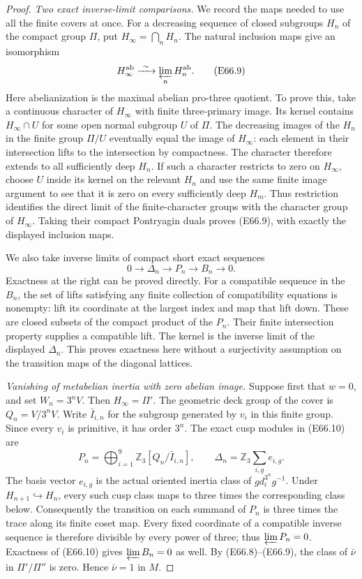 \begin{proof}
\emph{Two exact inverse-limit comparisons.}
We record the maps needed to use all the finite covers at once.
For a decreasing sequence of closed subgroups $H_n$ of the
compact group $\Pi$, put $H_\infty=\bigcap_nH_n$.
The natural inclusion maps give an isomorphism
\[
                 H_\infty^{\rm ab}
                       \xrightarrow{\ \sim\ }
                       \varprojlim_n H_n^{\rm ab}.
 \tag{E66.9}
\]
Here abelianization is the maximal abelian pro-three quotient.
To prove this, take a continuous character of $H_\infty$ with
finite three-primary image. Its kernel contains
$H_\infty\cap U$ for some open normal subgroup $U$ of $\Pi$.
The decreasing images of the $H_n$ in the finite group $\Pi/U$
eventually equal the image of $H_\infty$: each element in their
intersection lifts to the intersection by compactness.
The character therefore extends to all sufficiently deep $H_n$.
If such a character restricts to zero on $H_\infty$, choose $U$
inside its kernel on the relevant $H_n$ and use the same finite
image argument to see that it is zero on every sufficiently
deep $H_m$. Thus restriction identifies the direct limit of the
finite-character groups with the character group of
$H_\infty$. Taking their compact Pontryagin duals proves
(E66.9), with exactly the displayed inclusion maps.

We also take inverse limits of compact short exact sequences
\[
       0\longrightarrow\Delta_n\longrightarrow P_n
                \longrightarrow B_n\longrightarrow0 .
 \tag{E66.10}
\]
Exactness at the right can be proved directly. For a compatible
sequence in the $B_n$, the set of lifts satisfying any finite
collection of compatibility equations is nonempty: lift its
coordinate at the largest index and map that lift down.
These are closed subsets of the compact product of the $P_n$.
Their finite intersection property supplies a compatible lift.
The kernel is the inverse limit of the displayed $\Delta_n$.
This proves exactness here without a surjectivity assumption
on the transition maps of the diagonal lattices.

\emph{Vanishing of metabelian inertia with zero abelian image.}
Suppose first that $w=0$, and set $W_n=3^nV$.
Then $H_\infty=\Pi'$. The geometric deck group of the cover is
$Q_n=V/3^nV$. Write $\bar I_{i,n}$ for the subgroup generated
by $v_i$ in this finite group. Since every $v_i$ is primitive,
it has order $3^n$. The exact cusp modules in (E66.10) are
\[
 P_n=\bigoplus_{i=1}^{9}\mathbb Z_3[Q_n/\bar I_{i,n}],
 \qquad
 \Delta_n=\mathbb Z_3\sum_{i,g}e_{i,g}.
 \tag{E66.11}
\]
The basis vector $e_{i,g}$ is the actual oriented inertia
class of $g d_i^{3^n}g^{-1}$.
Under $H_{n+1}\hookrightarrow H_n$, every such cusp class
maps to three times the corresponding class below.
Consequently the transition on each summand of $P_n$ is
three times the trace along its finite coset map.
Every fixed coordinate of a compatible inverse sequence is
therefore divisible by every power of three; thus
$\varprojlim P_n=0$. Exactness of (E66.10) gives
$\varprojlim B_n=0$ as well.
By (E66.8)--(E66.9), the class of $\bar\nu$ in
$\Pi'/\Pi''$ is zero. Hence $\bar\nu=1$ in $M$.


\end{proof}
